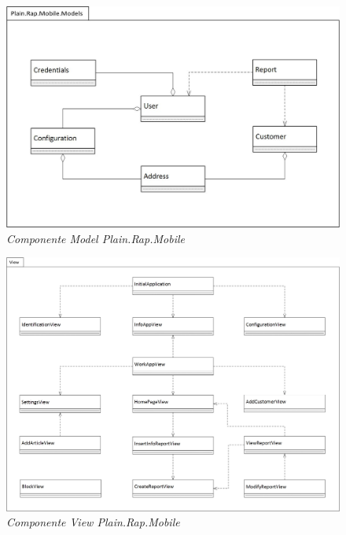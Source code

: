 		\begin{figure}[ht]
			\centering
			\includegraphics[scale=0.35]{immagini/progettazione/Models.jpg}
			\caption{\textit{Componente Model Plain.Rap.Mobile}}
		\end{figure}\FloatBarrier
		
		\begin{figure}[ht]
			\centering
			\includegraphics[scale=0.35]{immagini/progettazione/plainrap_view.jpg}
			\caption{\textit{Componente View Plain.Rap.Mobile}}
		\end{figure}\FloatBarrier
		
